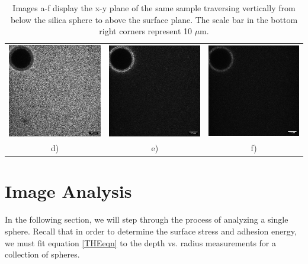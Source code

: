\begin{table}[h!]
\begin{tabular}{ccc}
		\includegraphics[width= .33\linewidth]{Chapters/Figures/190215_g91_glass_sphere011_cascade4.png} & \includegraphics[width= .33\linewidth]{Chapters/Figures/190215_g91_glass_sphere011_cascade5.png} & \includegraphics[width= .33\linewidth]{Chapters/Figures/190215_g91_glass_sphere011_cascade6.png}
		\\
		d) & e) & f) 
	\end{tabular}
	\caption[Vertical path through image stack]{Images a-f display the x-y plane of the same sample traversing vertically from below the silica sphere to above the surface plane. The scale bar in the bottom right corners represent 10 $\mu$m.} 
	\label{fig:sphere011cascade}
\end{table}


\section{Image Analysis}
In the following section, we will step through the process of analyzing a single sphere. Recall that in order to determine the surface stress and adhesion energy, we must fit equation \ref{THEeqn} to the depth vs. radius measurements for a collection of spheres.  


